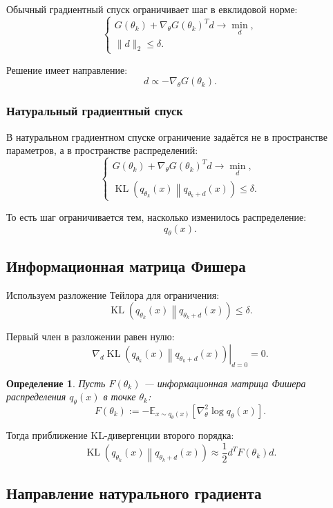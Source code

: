 \documentclass[12pt,a4paper]{article}
\newtheorem{definition}{Определение}
\begin{document}
Обычный градиентный спуск ограничивает шаг в евклидовой норме:
\[
\begin{cases}
G(\theta_k)
+
\nabla_\theta G(\theta_k)^T d
\to
\min\limits_d,
\\[0.4em]
\|d\|_2
\le
\delta.
\end{cases}
\]

Решение имеет направление:
\[
d
\propto
-
\nabla_\theta G(\theta_k).
\]

\subsubsection{Натуральный градиентный спуск}

В натуральном градиентном спуске ограничение задаётся не в пространстве параметров, а в пространстве распределений:
\[
\begin{cases}
G(\theta_k)
+
\nabla_\theta G(\theta_k)^T d
\to
\min\limits_d,
\\[0.4em]
\operatorname{KL}
\left(
q_{\theta_k}(x)
\middle\|
q_{\theta_k+d}(x)
\right)
\le
\delta.
\end{cases}
\]

То есть шаг ограничивается тем, насколько изменилось распределение:
\[
q_\theta(x).
\]

\subsection{Информационная матрица Фишера}

Используем разложение Тейлора для ограничения:
\[
\operatorname{KL}
\left(
q_{\theta_k}(x)
\middle\|
q_{\theta_k+d}(x)
\right)
\le
\delta.
\]

Первый член в разложении равен нулю:
\[
\left.
\nabla_d
\operatorname{KL}
\left(
q_{\theta_k}(x)
\middle\|
q_{\theta_k+d}(x)
\right)
\right|_{d=0}
=
0.
\]

\begin{definition}
Пусть $F(\theta_k)$ --- информационная матрица Фишера распределения $q_\theta(x)$ в точке $\theta_k$:
\[
F(\theta_k)
:=
-
\mathbb E_{x\sim q_\theta(x)}
\left[
\nabla_\theta^2
\log q_\theta(x)
\right].
\]
\end{definition}

Тогда приближение KL-дивергенции второго порядка:
\[
\operatorname{KL}
\left(
q_{\theta_k}(x)
\middle\|
q_{\theta_k+d}(x)
\right)
\approx
\frac{1}{2}
d^T
F(\theta_k)
d.
\]

\subsection{Направление натурального градиента}
\end{document}
